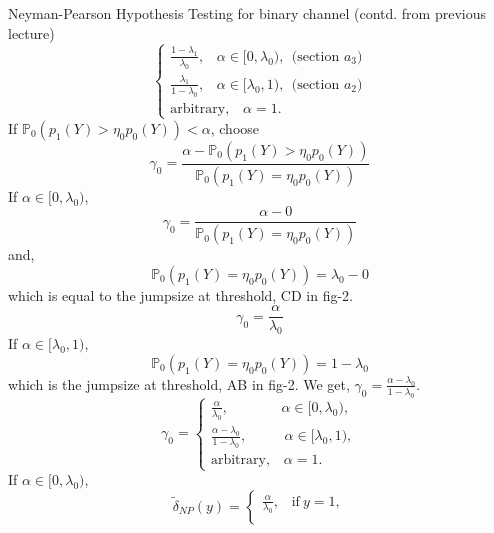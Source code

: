 \documentclass[a4paper,english,12pt]{article}
\begin{document}
\begin{exmp}{Neyman-Pearson Hypothesis Testing for binary channel (contd. from previous lecture)}
\begin{equation}
\begin{cases}
\frac{1-\lambda_1}{\lambda_0},\hspace{10pt}\alpha \in [0,\lambda_0),~~\mbox{(section $a_3$)}\\
\frac{\lambda_1}{1-\lambda_0},\hspace{10pt}\alpha \in [\lambda_0,1),~~\mbox{(section $a_2$)}\\
\mbox{arbitrary},\hspace{10pt}\alpha = 1.
\end{cases}
\end{equation}
If $\mathbb{P}_0(p_1(Y) > \eta_0 p_0(Y)) <\alpha$, choose  
\begin{equation}
\gamma_0 = \frac{\alpha-\mathbb{P}_0(p_1(Y) > \eta_0 p_0(Y))}{\mathbb{P}_0(p_1(Y) = \eta_0 p_0(Y))}
\end{equation}
If $\alpha \in [0,\lambda_0)$,
\begin{equation}
\gamma_0 = \frac{\alpha-0}{\mathbb{P}_0(p_1(Y) = \eta_0 p_0(Y))}
\end{equation}
and,
\begin{equation}
\mathbb{P}_0(p_1(Y) = \eta_0 p_0(Y)) = \lambda_0-0
\end{equation}
which is equal to the jumpsize at threshold, CD in fig-2.
\begin{equation}
\gamma_0 = \frac{\alpha}{\lambda_0}
\end{equation}
If $\alpha \in [\lambda_0,1)$,
\begin{equation}
\mathbb{P}_0(p_1(Y) = \eta_0 p_0(Y)) = 1-\lambda_0
\end{equation}
which is the jumpsize at threshold, AB in fig-2. We get, $\gamma_0 = \frac{\alpha-\lambda_0}{1-\lambda_0}$.
\begin{equation}
\gamma_0=\begin{cases}
\frac{\alpha}{\lambda_0},\hspace{45pt}\alpha \in [0,\lambda_0),\\
\frac{\alpha-\lambda_0}{1-\lambda_0},\hspace{32pt}\alpha \in [\lambda_0,1),\\
\mbox{arbitrary},\hspace{10pt}\alpha = 1.
\end{cases}
\end{equation}
If $\alpha \in [0,\lambda_0)$, 
\begin{equation}
\tilde{\delta}_{NP} (y) =\begin{cases}
\frac{\alpha}{\lambda_0},\hspace{10pt}\mbox{if}~y=1,\\

\end{cases}
\end{equation}
\end{exmp}
\end{document}
